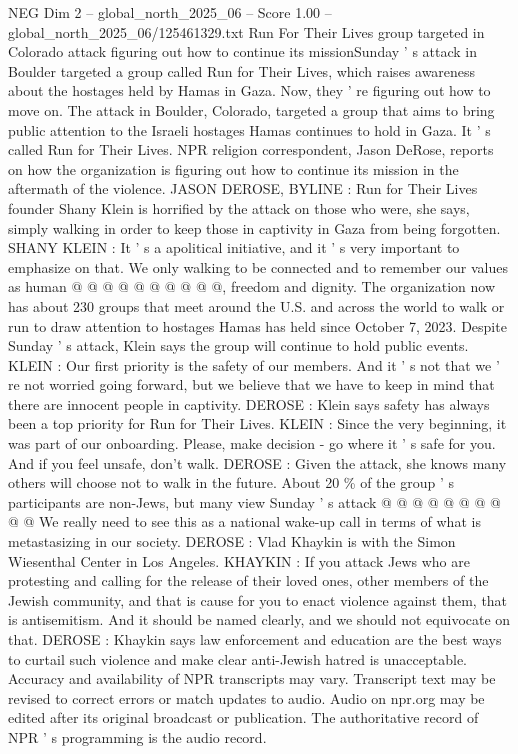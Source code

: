 \begin{textsample}{NEG Dim 2 – global\_north\_2025\_06 – Score 1.00 – global\_north\_2025\_06/125461329.txt}  \label{ex:f2_neg_226}
Run For Their Lives group targeted in Colorado attack figuring out how to continue its missionSunday ' s attack in Boulder targeted a group called Run for Their Lives, which raises awareness about the hostages held by Hamas in Gaza.
Now, they ' re figuring out how to move on.
The attack in Boulder, Colorado, targeted a group that aims to bring public attention to the Israeli hostages Hamas continues to hold in Gaza.
It ' s called Run for Their Lives.
NPR religion correspondent, Jason DeRose, reports on how the organization is figuring out how to continue its mission in the aftermath of the violence.
JASON DEROSE, BYLINE : Run for Their Lives founder Shany Klein is horrified by the attack on those who were, she says, simply walking in order to keep those in captivity in Gaza from being forgotten.
SHANY KLEIN : It ' s a apolitical initiative, and it ' s very important to emphasize on that.
We only walking to be connected and to remember our values as human @ @ @ @ @ @ @ @ @ @, freedom and dignity.
The organization now has about 230 groups that meet around the U.S. and across the world to walk or run to draw attention to hostages Hamas has held since October 7, 2023.
Despite Sunday ' s attack, Klein says the group will continue to hold public events.
KLEIN : Our first priority is the safety of our members.
And it ' s not that we ' re not worried going forward, but we believe that we have to keep in mind that there are innocent people in captivity.
DEROSE : Klein says safety has always been a top priority for Run for Their Lives.
KLEIN : Since the very beginning, it was part of our onboarding.
Please, make decision - go where it ' s safe for you.
And if you feel unsafe, don't walk.
DEROSE : Given the attack, she knows many others will choose not to walk in the future.
About 20 \% of the group ' s participants are non-Jews, but many view Sunday ' s attack @ @ @ @ @ @ @ @ @ @ We really need to see this as a national wake-up call in terms of what is metastasizing in our society.
DEROSE : Vlad Khaykin is with the Simon Wiesenthal Center in Los Angeles.
KHAYKIN : If you attack Jews who are protesting and calling for the release of their loved ones, other members of the Jewish community, and that is cause for you to enact violence against them, that is antisemitism.
And it should be named clearly, and we should not equivocate on that.
DEROSE : Khaykin says law enforcement and education are the best ways to curtail such violence and make clear anti-Jewish hatred is unacceptable.
Accuracy and availability of NPR transcripts may vary.
Transcript text may be revised to correct errors or match updates to audio.
Audio on npr.org may be edited after its original broadcast or publication.
The authoritative record of NPR ' s programming is the audio record.

\end{textsample}
